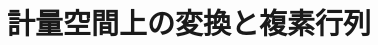 \documentclass[../../topic_linear-algebra]{subfiles}
\begin{document}
\chapter{計量空間上の変換と複素行列}



\end{document}
